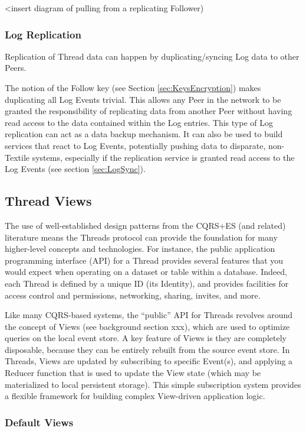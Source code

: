 \documentclass{comjnl}
\begin{document}
<insert diagram of pulling from a replicating Follower)

\subsubsection{Log Replication}

Replication of Thread data can happen by duplicating/syncing Log data to other Peers.

The notion of the Follow key (see Section  \ref{sec:KeysEncryption}) makes duplicating all Log Events trivial. This allows any Peer in the network to be granted the responsibility of replicating data from another Peer without having read access to the data contained within the Log entries. This type of Log replication can act as a data backup mechanism. It can also be used to build services that react to Log Events, potentially pushing data to disparate, non-Textile systems, especially if the replication service is granted read access to the Log Events (see section  \ref{sec:LogSync}).

\subsection{Thread Views} \label{sec:threadviews}

The use of well-established design patterns from the CQRS+ES (and related) literature means the Threads protocol can provide the foundation for many higher-level concepts and technologies. For instance, the public application programming interface (API) for a Thread provides several features that you would expect when operating on a dataset or table within a database. Indeed, each Thread is defined by a unique ID (its Identity), and provides facilities for access control and permissions, networking, sharing, invites, and more.

Like many CQRS-based systems, the “public” API for Threads revolves around the concept of Views (see background section xxx), which are used to optimize queries on the local event store. A key feature of Views is they are completely disposable, because they can be entirely rebuilt from the source event store. In Threads, Views are updated by subscribing to specific Event(s), and applying a Reducer function that is used to update the View state (which may be materialized to local persistent storage). This simple subscription system provides a flexible framework for building complex View-driven application logic.

\subsubsection{Default Views}
\end{document}
